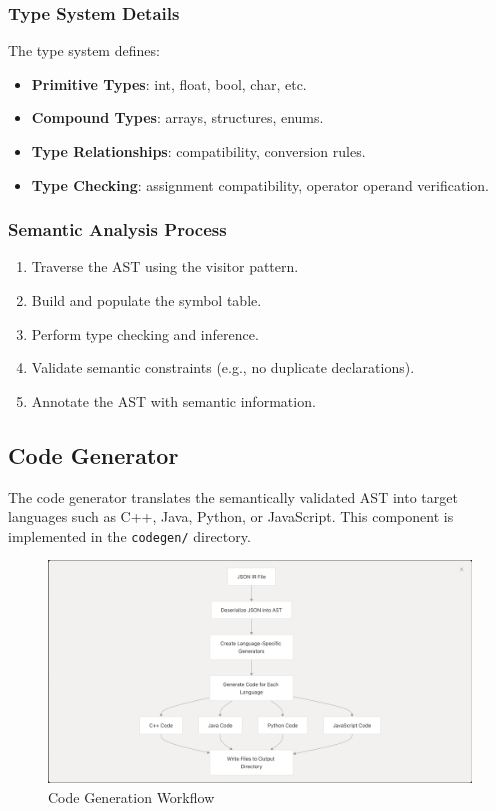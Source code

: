 \documentclass[conference]{IEEEtran}
\begin{document}
\subsubsection{Type System Details} %
The type system defines:
\begin{itemize}
    \item \textbf{Primitive Types}: int, float, bool, char, etc.
    \item \textbf{Compound Types}: arrays, structures, enums.
    \item \textbf{Type Relationships}: compatibility, conversion rules.
    \item \textbf{Type Checking}: assignment compatibility, operator operand verification.
\end{itemize}

\subsubsection{Semantic Analysis Process}
\begin{enumerate}
    \item Traverse the AST using the visitor pattern.
    \item Build and populate the symbol table.
    \item Perform type checking and inference.
    \item Validate semantic constraints (e.g., no duplicate declarations).
    \item Annotate the AST with semantic information.
\end{enumerate}

\subsection{Code Generator}
The code generator translates the semantically validated AST into target languages such as C++, Java, Python, or JavaScript. This component is implemented in the \texttt{codegen/} directory.
\begin{figure}[H]
    \centering
    \includegraphics[width=1\linewidth]{codegen_flow.png}
    \caption{Code Generation Workflow}
    \label{fig:enter-label}
\end{figure}
\end{document}
